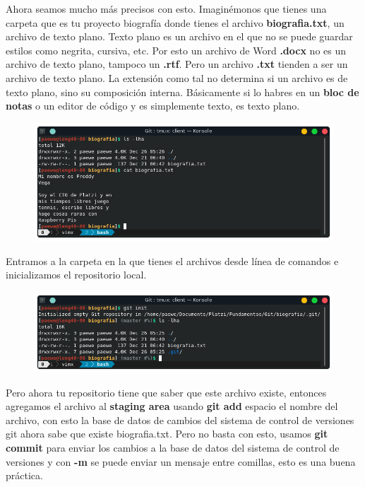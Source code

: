 \documentclass{article}
\begin{document}
Ahora seamos mucho más precisos con esto. Imaginémonos que tienes una carpeta
que es tu proyecto biografía donde tienes el archivo \textbf{biografia.txt}, un
archivo de texto plano. Texto plano es un archivo en el que no se puede guardar
estilos como negrita, cursiva, etc. Por esto un archivo de Word \textbf{.docx}
no es un archivo de texto plano, tampoco un \textbf{.rtf}. Pero un archivo
\textbf{.txt} tienden a ser un archivo de texto plano. La extensión como tal no
determina si un archivo es de texto plano, sino su composición interna.
Básicamente si lo habres en un \textbf{bloc de notas} o un editor de código y
es simplemente texto, es texto plano.

\begin{figure}[h!]
  \centering
  \includegraphics[scale=0.75]{./Pictures/004_biografiatxt.png}
\end{figure}

Entramos a la carpeta en la que tienes el archivos desde línea de comandos e
inicializamos el repositorio local.

\begin{figure}[h!]
  \centering
  \includegraphics[scale=0.75]{./Pictures/005_gitinit.png}
\end{figure}

Pero ahora tu repositorio tiene que saber que este archivo existe, entonces
agregamos el archivo al \textbf{staging area} usando \textbf{git add} espacio el
nombre del archivo, con esto la base de datos de cambios del sistema de control
de versiones git ahora sabe que existe biografia.txt. Pero no basta con esto,
usamos \textbf{git commit} para enviar los cambios a la base de datos del
sistema de control de versiones y con \textbf{-m} se puede enviar un mensaje
entre comillas, esto es una buena práctica.
\end{document}
